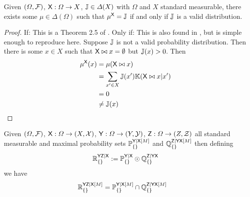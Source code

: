 \begin{theorem}[Validity]\label{th:completion}
Given $(\Omega,\mathcal{F})$, $\mathsf{X}:\Omega\to X$, $\mathbb{J}\in \Delta(X)$ with $\Omega$ and $X$ standard measurable, there exists some $\mu\in \Delta(\Omega)$ such that $\mu^{\mathsf{X}}=\mathbb{J}$ if and only if $\mathbb{J}$ is a valid distribution.
\end{theorem}

\begin{proof}
If:
This is a Theorem 2.5 of \citet{ershov_extension_1975}.
Only if:
This is also found in \citet{ershov_extension_1975}, but is simple enough to reproduce here. Suppose $\mathbb{J}$ is not a valid probability distribution. Then there is some $x\in X$ such that $\mathsf{X}\bowtie x = \emptyset$ but $\mathbb{J}(x)>0$. Then
\begin{align}
    \mu^{\mathsf{X}}(x) &= \mu (\mathsf{X}\bowtie x)\\
    &= \sum_{x'\in X} \mathbb{J}(x') \mathbb{K}(\mathsf{X}\bowtie x|x')\\
    &= 0\\
    &\neq \mathbb{J}(x)
\end{align}
\end{proof}


\begin{lemma}\label{th:intersection}
Given $(\Omega,\mathcal{F})$, $\mathsf{X}:\Omega\to (X,\mathcal{X})$, $\mathsf{Y}:\Omega\to (Y,\mathcal{Y})$, $\mathsf{Z}:\Omega\to (Z,\mathcal{Z})$ all standard measurable and maximal probability sets $\mathbb{P}_{\{\}}^{\mathsf{Y}|\mathsf{X}[M]}$ and $\mathbb{Q}_{\{\}}^{\mathsf{Z}|\mathsf{YX}[M]}$ then defining
\begin{align}
    \mathbb{R}_{\{\}}^{\mathsf{YZ}|\mathsf{X}} := \mathbb{P}_{\{\}}^{\mathsf{Y}|\mathsf{X}}\odot \mathbb{Q}_{\{\}}^{\mathsf{Z}|\mathsf{YX}}
\end{align}
we have
\begin{align}
    \mathbb{R}_{\{\}}^{\mathsf{YZ}|\mathsf{X}[M]} &= \mathbb{P}_{\{\}}^{\mathsf{Y}|\mathsf{X}[M]}\cap \mathbb{Q}_{\{\}}^{\mathsf{Z}|\mathsf{YX}[M]}
\end{align}
\end{lemma}

